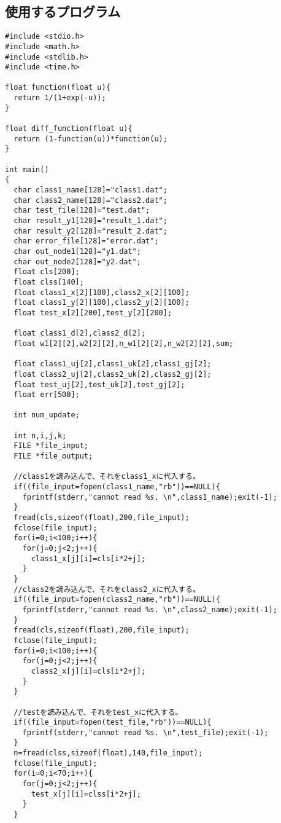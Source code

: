 \documentclass[a4j,12]{jarticle}
\begin{document}
\subsection{使用するプログラム}
\begin{lstlisting}[caption=プログラム,label=ラベル]
#include <stdio.h>
#include <math.h>
#include <stdlib.h>
#include <time.h>

float function(float u){
  return 1/(1+exp(-u));
}

float diff_function(float u){
  return (1-function(u))*function(u);
}

int main()
{
  char class1_name[128]="class1.dat";
  char class2_name[128]="class2.dat";
  char test_file[128]="test.dat";
  char result_y1[128]="result_1.dat";
  char result_y2[128]="result_2.dat";
  char error_file[128]="error.dat";
  char out_node1[128]="y1.dat";
  char out_node2[128]="y2.dat";
  float cls[200];
  float clss[140];
  float class1_x[2][100],class2_x[2][100];
  float class1_y[2][100],class2_y[2][100];
  float test_x[2][200],test_y[2][200];

  float class1_d[2],class2_d[2];
  float w1[2][2],w2[2][2],n_w1[2][2],n_w2[2][2],sum;

  float class1_uj[2],class1_uk[2],class1_gj[2];
  float class2_uj[2],class2_uk[2],class2_gj[2];
  float test_uj[2],test_uk[2],test_gj[2];
  float err[500];
  
  int num_update;
  
  int n,i,j,k;
  FILE *file_input;
  FILE *file_output;

  //class1を読み込んで、それをclass1_xに代入する。
  if((file_input=fopen(class1_name,"rb"))==NULL){
    fprintf(stderr,"cannot read %s. \n",class1_name);exit(-1);
  }
  fread(cls,sizeof(float),200,file_input);
  fclose(file_input);
  for(i=0;i<100;i++){
    for(j=0;j<2;j++){
      class1_x[j][i]=cls[i*2+j];
    }
  }
  //class2を読み込んで、それをclass2_xに代入する。
  if((file_input=fopen(class2_name,"rb"))==NULL){
    fprintf(stderr,"cannot read %s. \n",class2_name);exit(-1);
  }
  fread(cls,sizeof(float),200,file_input);
  fclose(file_input);
  for(i=0;i<100;i++){
    for(j=0;j<2;j++){
      class2_x[j][i]=cls[i*2+j];
    }
  }

  //testを読み込んで、それをtest_xに代入する。
  if((file_input=fopen(test_file,"rb"))==NULL){
    fprintf(stderr,"cannot read %s. \n",test_file);exit(-1);
  }
  n=fread(clss,sizeof(float),140,file_input);
  fclose(file_input);
  for(i=0;i<70;i++){
    for(j=0;j<2;j++){
      test_x[j][i]=clss[i*2+j];
    }
  }



\end{lstlisting}
\end{document}
